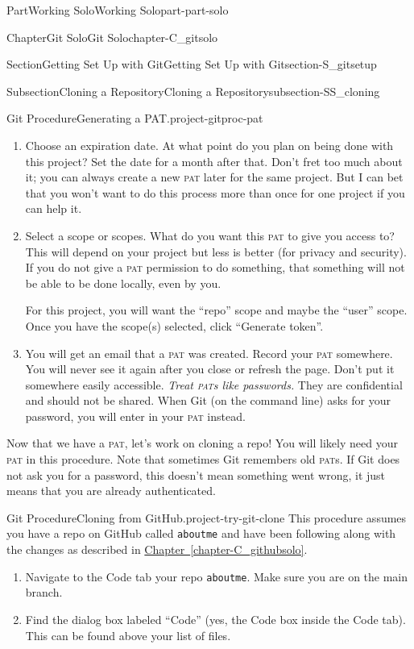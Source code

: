 \documentclass[oneside,10pt,]{book}
\newcommand{\xreffont}{\relax}
\newcommand{\mono}[1]{\texttt{#1}}
\newcommand{\acronym}[1]{\textsc{\MakeLowercase{#1}}}
\DeclareRobustCommand{\acronymintitle}[1]{\texorpdfstring{#1}{#1}}
\begin{document}
\begin{partptx}{Part}{Working Solo}{}{Working Solo}{}{}{part-part-solo}
\begin{chapterptx}{Chapter}{Git Solo}{}{Git Solo}{}{}{chapter-C_gitsolo}
\begin{sectionptx}{Section}{Getting Set Up with Git}{}{Getting Set Up with Git}{}{}{section-S_gitsetup}
\begin{subsectionptx}{Subsection}{Cloning a Repository}{}{Cloning a Repository}{}{}{subsection-SS_cloning}
\begin{project}{Git Procedure}{Generating a \acronymintitle{PAT}.}{project-gitproc-pat}
\begin{enumerate}[font=\bfseries,label=(\alph*),ref=\alph*]
\par
If you choose the above, make sure you only use the token for that purpose!%
\item{}Choose an expiration date. At what point do you plan on being done with this project? Set the date for a month after that. Don't fret too much about it; you can always create a new \acronym{PAT} later for the same project. But I can bet that you won't want to do this process more than once for one project if you can help it.%
\item{}Select a scope or scopes. What do you want this \acronym{PAT} to give you access to? This will depend on your project but less is better (for privacy and security). If you do not give a \acronym{PAT} permission to do something, that something will not be able to be done locally, even by you.%
\par
For this project, you will want the ``repo'' scope and maybe the ``user'' scope. Once you have the scope(s) selected, click ``Generate token''.%
\item{}You will get an email that a \acronym{PAT} was created. Record your \acronym{PAT} somewhere. You will never see it again after you close or refresh the page. Don't put it somewhere easily accessible. \emph{Treat \acronym{PAT}s like passwords.} They are confidential and should not be shared. When Git (on the command line) asks for your password, you will enter in your \acronym{PAT} instead.%
\end{enumerate}%
\end{project}%
Now that we have a \acronym{PAT}, let's work on cloning a repo! You will likely need your \acronym{PAT} in this procedure. Note that sometimes Git remembers old \acronym{PAT}s. If Git does not ask you for a password, this doesn't mean something went wrong, it just means that you are already authenticated.%
\begin{project}{Git Procedure}{Cloning from GitHub.}{project-try-git-clone}%
%
This procedure assumes you have a repo on GitHub called \mono{aboutme} and have been following along with the changes as described in \hyperref[chapter-C_githubsolo]{Chapter~{\xreffont\ref{chapter-C_githubsolo}}}.%
\begin{enumerate}[font=\bfseries,label=(\alph*),ref=\alph*]%
\item{}Navigate to the Code tab your repo \mono{aboutme}. Make sure you are on the main branch.%
\item\label{task-clone-https}Find the dialog box labeled ``Code'' (yes, the Code box inside the Code tab). This can be found above your list of files.%

\end{enumerate}
\end{project}
\end{subsectionptx}
\end{sectionptx}
\end{chapterptx}
\end{partptx}
\end{document}

